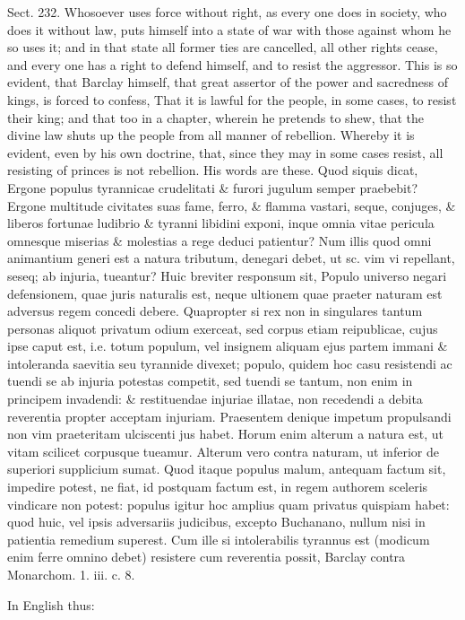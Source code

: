 \documentclass[11pt,openany]{book}
\begin{document}
Sect. 232. Whosoever uses force without right, as every one does in society, who does it without law, puts himself into a state of war with those against whom he so uses it; and in that state all former ties are cancelled, all other rights cease, and every one has a right to defend himself, and to resist the aggressor. This is so evident, that Barclay himself, that great assertor of the power and sacredness of kings, is forced to confess, That it is lawful for the people, in some cases, to resist their king; and that too in a chapter, wherein he pretends to shew, that the divine law shuts up the people from all manner of rebellion. Whereby it is evident, even by his own doctrine, that, since they may in some cases resist, all resisting of princes is not rebellion. His words are these. Quod siquis dicat, Ergone populus tyrannicae crudelitati \& furori jugulum semper praebebit? Ergone multitude civitates suas fame, ferro, \& flamma vastari, seque, conjuges, \& liberos fortunae ludibrio \& tyranni libidini exponi, inque omnia vitae pericula omnesque miserias \& molestias a rege deduci patientur? Num illis quod omni animantium generi est a natura tributum, denegari debet, ut sc. vim vi repellant, seseq; ab injuria, tueantur? Huic breviter responsum sit, Populo universo negari defensionem, quae juris naturalis est, neque ultionem quae praeter naturam est adversus regem concedi debere. Quapropter si rex non in singulares tantum personas aliquot privatum odium exerceat, sed corpus etiam reipublicae, cujus ipse caput est, i.e. totum populum, vel insignem aliquam ejus partem immani \& intoleranda saevitia seu tyrannide divexet; populo, quidem hoc casu resistendi ac tuendi se ab injuria potestas competit, sed tuendi se tantum, non enim in principem invadendi: \& restituendae injuriae illatae, non recedendi a debita reverentia propter acceptam injuriam. Praesentem denique impetum propulsandi non vim praeteritam ulciscenti jus habet. Horum enim alterum a natura est, ut vitam scilicet corpusque tueamur. Alterum vero contra naturam, ut inferior de superiori supplicium sumat. Quod itaque populus malum, antequam factum sit, impedire potest, ne fiat, id postquam factum est, in regem authorem sceleris vindicare non potest: populus igitur hoc amplius quam privatus quispiam habet: quod huic, vel ipsis adversariis judicibus, excepto Buchanano, nullum nisi in patientia remedium superest. Cum ille si intolerabilis tyrannus est (modicum enim ferre omnino debet) resistere cum reverentia possit, Barclay contra Monarchom. 1. iii. c. 8.

In English thus:
\end{document}
